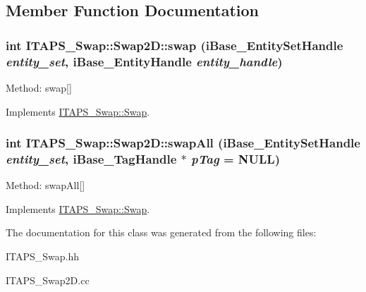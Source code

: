 \subsection{Member Function Documentation}
\hypertarget{class_i_t_a_p_s___swap_1_1_swap2_d_a84a78678e5e830d16c725a93f3b5038f}{
\subsubsection[{swap}]{\setlength{\rightskip}{0pt plus 5cm}int ITAPS\_\-Swap::Swap2D::swap (iBase\_\-EntitySetHandle {\em entity\_\-set}, \/  iBase\_\-EntityHandle {\em entity\_\-handle})}}
\label{class_i_t_a_p_s___swap_1_1_swap2_d_a84a78678e5e830d16c725a93f3b5038f}
Method: swap\mbox{[}\mbox{]} 

Implements \hyperlink{class_i_t_a_p_s___swap_1_1_swap_adfb444f7ade3254ba8fa9ced2ec15e65}{ITAPS\_\-Swap::Swap}.

\hypertarget{class_i_t_a_p_s___swap_1_1_swap2_d_a4bee7d3a08e3ff6ac85a81ec321479ef}{
\subsubsection[{swapAll}]{\setlength{\rightskip}{0pt plus 5cm}int ITAPS\_\-Swap::Swap2D::swapAll (iBase\_\-EntitySetHandle {\em entity\_\-set}, \/  iBase\_\-TagHandle $\ast$ {\em pTag} = {\ttfamily NULL})}}
\label{class_i_t_a_p_s___swap_1_1_swap2_d_a4bee7d3a08e3ff6ac85a81ec321479ef}
Method: swapAll\mbox{[}\mbox{]} 

Implements \hyperlink{class_i_t_a_p_s___swap_1_1_swap_a8a1fdc1a12fb71dfe28881b10277eafc}{ITAPS\_\-Swap::Swap}.



The documentation for this class was generated from the following files:\begin{DoxyCompactItemize}
\item 
ITAPS\_\-Swap.hh\item 
ITAPS\_\-Swap2D.cc\end{DoxyCompactItemize}
